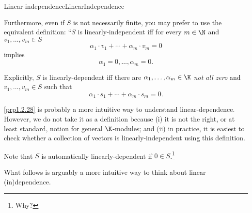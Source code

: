 \begin{dfn}{Linear-independence}{LinearIndependence}
\begin{rmk}
		Furthermore, even if $S$ is not necessarily finite, you may prefer to use the equivalent definition:  ``$S$ is linearly-independent iff for every $m\in \N$ and $v_1,\ldots ,v_m\in S$
		\begin{equation}
			\alpha _1\cdot v_1+\cdots +\alpha _m\cdot v_m=0
		\end{equation}
		implies
		\begin{equation}
			\alpha _1=0,\ldots ,\alpha _m=0.
		\end{equation}
	\end{rmk}
	\begin{rmk}
		Explicitly, $S$ is linearly-dependent iff there are $\alpha _1,\ldots ,\alpha _m\in \K$ \emph{not all zero} and $v_1,\ldots ,v_m\in S$ such that
		\begin{equation}
			\alpha _1\cdot s_1+\cdots +\alpha _m\cdot s_m=0.
		\end{equation}
	\end{rmk}
	\begin{rmk}
		\cref{prp1.2.28} is probably a more intuitive way to understand linear-dependence.  However, we do not take it as a definition because (i) it is not the right, or at least standard, notion for general $\K$-modules; and (ii) in practice, it is easiest to check whether a collection of vectors is linearly-independent using this definition.
	\end{rmk}
	\begin{rmk}
		Note that $S$ is automatically linearly-dependent if $0\in S$.\footnote{Why?}
	\end{rmk}
\end{dfn}
What follows is arguably a more intuitive way to think about linear (in)dependence.
